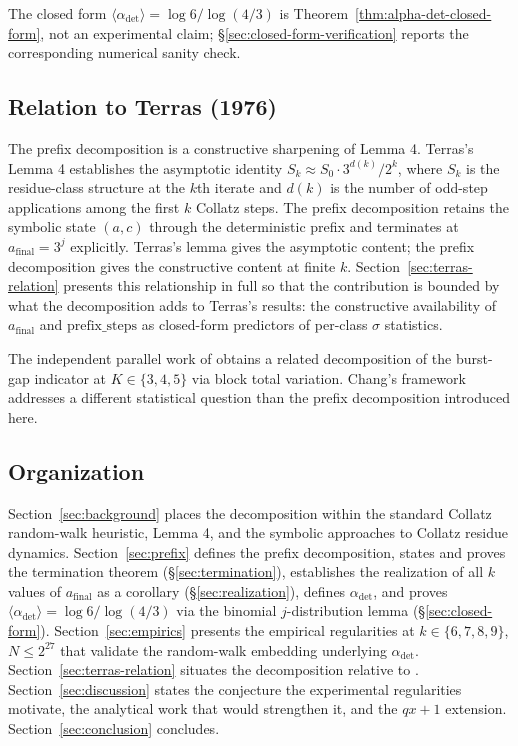 \documentclass[pdflatex,sn-mathphys-num]{sn-jnl}
\theoremstyle{thmstyleone}%
\theoremstyle{definition}
\theoremstyle{plain}
\begin{document}
The closed form $\langle \alpha_{\text{det}} \rangle = \log 6 / \log(4/3)$ is Theorem~\ref{thm:alpha-det-closed-form}, not an experimental claim; \S\ref{sec:closed-form-verification} reports the corresponding numerical sanity check.
 
\subsection{Relation to Terras (1976)} The prefix decomposition is a constructive sharpening of \citet{terras1976} Lemma 4. Terras's Lemma 4 establishes the asymptotic identity $S_k \approx S_0 \cdot 3^{d(k)} / 2^k$, where $S_k$ is the residue-class structure at the $k$th iterate and $d(k)$ is the number of odd-step applications among the first $k$ Collatz steps. The prefix decomposition retains the symbolic state $(a, c)$ through the deterministic prefix and terminates at $a_{\text{final}} = 3^j$ explicitly. Terras's lemma gives the asymptotic content; the prefix decomposition gives the constructive content at finite $k$. Section~\ref{sec:terras-relation} presents this relationship in full so that the contribution is bounded by what the decomposition adds to Terras's results: the constructive availability of $a_{\text{final}}$ and $\text{prefix\_steps}$ as closed-form predictors of per-class $\sigma$ statistics.
 
The independent parallel work of \citet{chang2026a, chang2026b} obtains a related decomposition of the burst-gap indicator at $K \in \{3, 4, 5\}$ via block total variation. Chang's framework addresses a different statistical question than the prefix decomposition introduced here.
 
\subsection{Organization} Section~\ref{sec:background} places the decomposition within the standard Collatz random-walk heuristic, \citet{terras1976} Lemma 4, and the symbolic approaches to Collatz residue dynamics. Section~\ref{sec:prefix} defines the prefix decomposition, states and proves the termination theorem (\S\ref{sec:termination}), establishes the realization of all $k$ values of $a_{\text{final}}$ as a corollary (\S\ref{sec:realization}), defines $\alpha_{\text{det}}$, and proves $\langle \alpha_{\text{det}} \rangle = \log 6 / \log(4/3)$ via the binomial $j$-distribution lemma (\S\ref{sec:closed-form}). Section~\ref{sec:empirics} presents the empirical regularities at $k \in \{6, 7, 8, 9\}$, $N \leq 2^{27}$ that validate the random-walk embedding underlying $\alpha_{\text{det}}$. Section~\ref{sec:terras-relation} situates the decomposition relative to \citet{terras1976}. Section~\ref{sec:discussion} states the conjecture the experimental regularities motivate, the analytical work that would strengthen it, and the $qx+1$ extension. Section~\ref{sec:conclusion} concludes.
\end{document}
